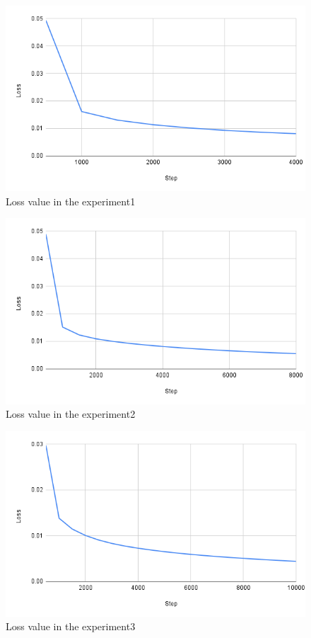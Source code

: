 \newpage
\begin{figure}[h]
  \centering
  \includegraphics[keepaspectratio, scale=0.5]{images/exp1.2_4000.png}
  \caption{Loss value in the experiment1}
  \label{Fig:exp1.2_4000}
  \end{figure}
  
\begin{figure}[h]
  \centering
  \includegraphics[keepaspectratio, scale=0.5]{images/exp1.2_8000.png}
  \caption{Loss value in the experiment2}
  \label{Fig:exp1.2_8000}
  \end{figure}

  \newpage
\begin{figure}[h]
  \centering
  \includegraphics[keepaspectratio, scale=0.5]{images/exp1.2_10000.png}
  \caption{Loss value in the experiment3}
  \label{Fig:exp1.2_10000}
  \end{figure}

